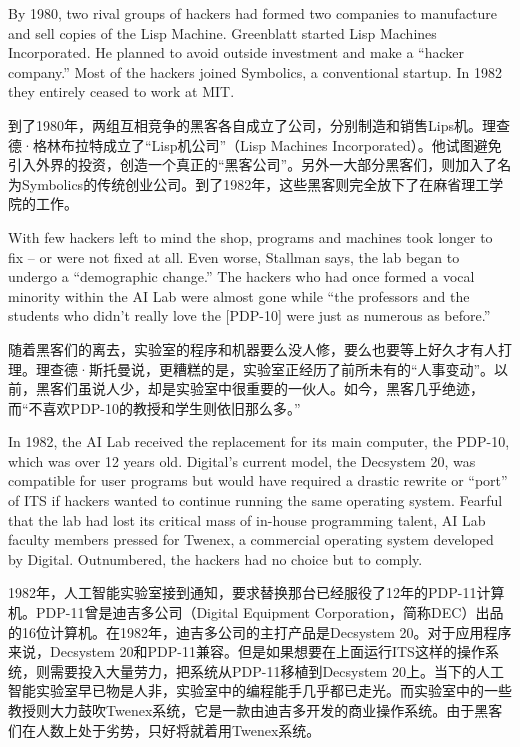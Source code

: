 \ifdefined\eng
By 1980, two rival groups of hackers had formed two companies to manufacture and sell copies of the Lisp Machine.  Greenblatt started Lisp Machines Incorporated.  He planned to avoid outside investment and make a ``hacker company.''  Most of the hackers joined Symbolics, a conventional startup.  In 1982 they entirely ceased to work at MIT.
\fi

\ifdefined\chs
到了1980年，两组互相竞争的黑客各自成立了公司，分别制造和销售Lips机。理查德·格林布拉特成立了``Lisp机公司''（Lisp Machines Incorporated）。他试图避免引入外界的投资，创造一个真正的``黑客公司''。另外一大部分黑客们，则加入了名为Symbolics的传统创业公司。到了1982年，这些黑客则完全放下了在麻省理工学院的工作。
\fi

\ifdefined\eng
With few hackers left to mind the shop, programs and machines took longer to fix -- or were not fixed at all.  Even worse, Stallman says, the lab began to undergo a ``demographic change.'' The hackers who had once formed a vocal minority within the AI Lab were almost gone while ``the professors and the students who didn't really love the [PDP-10] were just as numerous as before.''
\fi

\ifdefined\chs
随着黑客们的离去，实验室的程序和机器要么没人修，要么也要等上好久才有人打理。理查德·斯托曼说，更糟糕的是，实验室正经历了前所未有的``人事变动''。以前，黑客们虽说人少，却是实验室中很重要的一伙人。如今，黑客几乎绝迹，而``不喜欢PDP-10的教授和学生则依旧那么多。''
\fi

\ifdefined\eng
In 1982, the AI Lab received the replacement for its main computer, the PDP-10, which was over 12 years old. Digital's current model, the Decsystem 20, was compatible for user programs but would have required a drastic rewrite or ``port'' of ITS if hackers wanted to continue running the same operating system. Fearful that the lab had lost its critical mass of in-house programming talent, AI Lab faculty members pressed for Twenex, a commercial operating system developed by Digital. Outnumbered, the hackers had no choice but to comply.
\fi

\ifdefined\chs
1982年，人工智能实验室接到通知，要求替换那台已经服役了12年的PDP-11计算机。PDP-11曾是迪吉多公司（Digital Equipment Corporation，简称DEC）出品的16位计算机。在1982年，迪吉多公司的主打产品是Decsystem 20。对于应用程序来说，Decsystem 20和PDP-11兼容。但是如果想要在上面运行ITS这样的操作系统，则需要投入大量劳力，把系统从PDP-11移植到Decsystem 20上。当下的人工智能实验室早已物是人非，实验室中的编程能手几乎都已走光。而实验室中的一些教授则大力鼓吹Twenex系统，它是一款由迪吉多开发的商业操作系统。由于黑客们在人数上处于劣势，只好将就着用Twenex系统。
\fi

